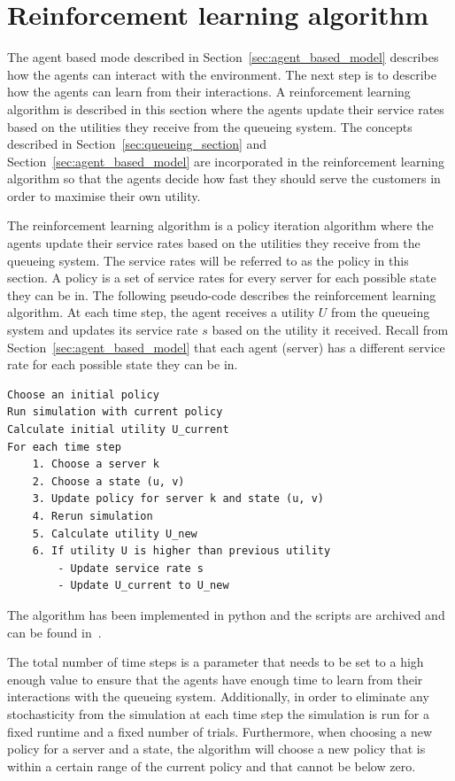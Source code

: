 \section{Reinforcement learning algorithm}\label{sec:reinforcement_learning}

The agent based mode described in Section~\ref{sec:agent_based_model} describes
how the agents can interact with the environment.
The next step is to describe how the agents can learn from their interactions.
A reinforcement learning algorithm is described in this section where the agents
update their service rates based on the utilities they receive from the
queueing system.
The concepts described in Section~\ref{sec:queueing_section} and
Section~\ref{sec:agent_based_model} are incorporated in the reinforcement
learning algorithm so that the agents decide how fast they should serve the
customers in order to maximise their own utility.

The reinforcement learning algorithm is a policy iteration algorithm where
the agents update their service rates based on the utilities they receive
from the queueing system.
The service rates will be referred to as the policy in this section.
A policy is a set of service rates for every server for each possible state
they can be in.
The following pseudo-code describes the reinforcement learning algorithm.
At each time step, the agent receives a utility $U$ from the queueing system
and updates its service rate $s$ based on the utility it received.
Recall from Section~\ref{sec:agent_based_model} that each agent (server) has
a different service rate for each possible state they can be in.

\vspace*{0.5cm}

\begin{lstlisting}
Choose an initial policy
Run simulation with current policy
Calculate initial utility U_current
For each time step
    1. Choose a server k
    2. Choose a state (u, v)
    3. Update policy for server k and state (u, v)
    4. Rerun simulation
    5. Calculate utility U_new
    6. If utility U is higher than previous utility
        - Update service rate s
        - Update U_current to U_new

\end{lstlisting}

The algorithm has been implemented in python and the scripts are archived and
can be found in~\cite{michalis_panayides_2023_7586860}.

The total number of time steps is a parameter that needs to be set to a high
enough value to ensure that the agents have enough time to learn from their
interactions with the queueing system.
Additionally, in order to eliminate any stochasticity from the simulation
at each time step the simulation is run for a fixed runtime and a fixed number
of trials.
Furthermore, when choosing a new policy for a server and a state, the
algorithm will choose a new policy that is within a certain range of the
current policy and that cannot be below zero.

